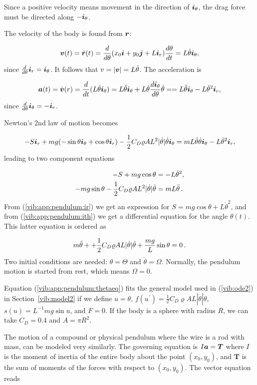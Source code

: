 \documentclass[%
oneside,                 %
final,                   %
10pt]{article}
\begin{document}
\noindent
Since a positive velocity means movement in the direction of $\ith$,
the drag force must be directed along $-\ith$.

The velocity of the body is found from $\rpos$:

\[ \v(t) = \dot\rpos (t) = \frac{d}{d\theta}(x_0\ii + y_0\jj + L\ir)\frac{d\theta}{dt} = L\dot\theta\ith,\]
since $\frac{d}{d\theta}\ir = \ith$. It follows that $v=|\v|=L\dot\theta$.
The acceleration is

\[ \acc(t) = \dot\v(r) = \frac{d}{dt}(L\dot\theta\ith)
= L\ddot\theta\ith + L\dot\theta\frac{d\ith}{d\theta}\dot\theta =
= L\ddot\theta\ith - L\dot\theta^2\ir,\]
since $\frac{d}{d\theta}\ith = -\ir$.

Newton's 2nd law of motion becomes

\[ -S\ir + mg(-\sin\theta\ith + \cos\theta\ir) -
\frac{1}{2}C_D\varrho AL^2|\dot\theta|\dot\theta\ith
= mL\ddot\theta\dot\theta\ith - L\dot\theta^2\ir,\]
leading to two component equations

\begin{align}
-S + mg\cos\theta &= -L\dot\theta^2,
\label{vib:app:pendulum:ir}\\ 
-mg\sin\theta - \frac{1}{2}C_D\varrho AL^2|\dot\theta|\dot\theta
&= mL\ddot\theta\tp
\label{vib:app:pendulum:ith}
\end{align}
From (\ref{vib:app:pendulum:ir}) we get an expression for
$S=mg\cos\theta + L\dot\theta^2$, and from (\ref{vib:app:pendulum:ith})
we get a differential equation for the angle $\theta(t)$. This latter
equation is ordered as

\begin{equation}
m\ddot\theta + + \frac{1}{2}C_D\varrho AL|\dot\theta|\dot\theta
+ \frac{mg}{L}\sin\theta = 0\tp
\label{vib:app:pendulum:thetaeq}
\end{equation}
Two initial conditions are needed: $\theta=\Theta$ and $\dot\theta = \Omega$.
Normally, the pendulum motion is started from rest, which means $\Omega =0$.

Equation (\ref{vib:app:pendulum:thetaeq}) fits the general model
used in (\ref{vib:ode2}) in Section~\ref{vib:model2} if we define
$u=\theta$, $f(u^{\prime}) = \frac{1}{2}C_D\varrho AL|\dot\theta|\dot\theta$,
$s(u) = L^{-1}mg\sin u$, and $F=0$.
If the body is a sphere with radius $R$, we can take $C_D=0.4$ and $A=\pi R^2$.

The motion of a compound or physical pendulum where the wire is a rod with
mass, can be modeled very similarly. The governing equation is
$I\acc = \bm{T}$ where $I$ is the moment of inertia of the entire body about
the point $(x_0,y_0)$, and $\bm{T}$ is the sum of moments of the forces
with respect to $(x_0,y_0)$. The vector equation reads
\end{document}
